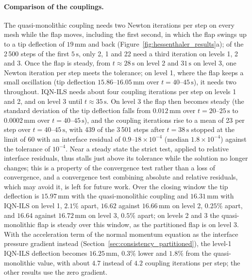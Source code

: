 \paragraph{Comparison of the couplings.}
The quasi-monolithic coupling needs two Newton iterations per step on every mesh while the flap moves, including the first second, in which the flap swings up to a tip deflection of $19\,\mathrm{mm}$ and back (Figure~\ref{fig:hessenthaler_results}a); of the 2\,500 steps of the first $5\,\mathrm{s}$, only 2, 1 and 22 need a third iteration on levels 1, 2 and 3.
Once the flap is steady, from $t \approx 28\,\mathrm{s}$ on level 2 and $31\,\mathrm{s}$ on level 3, one Newton iteration per step meets the tolerance; on level 1, where the flap keeps a small oscillation (tip deflection $15.86$--$16.05\,\mathrm{mm}$ over $t = 40$--$45\,\mathrm{s}$), it needs two throughout.
IQN-ILS needs about four coupling iterations per step on levels 1 and 2, and on level 3 until $t \approx 35\,\mathrm{s}$.
On level 3 the flap then becomes steady (the standard deviation of the tip deflection falls from $0.012\,\mathrm{mm}$ over $t = 20$--$25\,\mathrm{s}$ to $0.0002\,\mathrm{mm}$ over $t = 40$--$45\,\mathrm{s}$), and the coupling iterations rise to a mean of 23 per step over $t = 40$--$45\,\mathrm{s}$, with 439 of the 3\,501 steps after $t = 38\,\mathrm{s}$ stopped at the limit of 60 with an interface residual of $0.9$--$18\times10^{-4}$ (median $1.8\times10^{-4}$) against the tolerance of $10^{-4}$.
Near a steady state the strict test, applied to relative interface residuals, thus stalls just above its tolerance while the solution no longer changes; this is a property of the convergence test rather than a loss of convergence, and a convergence test combining absolute and relative residuals, which may avoid it, is left for future work.
Over the closing window the tip deflection is $15.97\,\mathrm{mm}$ with the quasi-monolithic coupling and $16.31\,\mathrm{mm}$ with IQN-ILS on level 1, $2.1\%$ apart, $16.62$ against $16.66\,\mathrm{mm}$ on level 2, $0.25\%$ apart, and $16.64$ against $16.72\,\mathrm{mm}$ on level 3, $0.5\%$ apart; on levels 2 and 3 the quasi-monolithic flap is steady over this window, as the partitioned flap is on level 3.
With the acceleration term of the normal momentum equation as the interface pressure gradient instead (Section~\ref{sec:consistency_partitioned}), the level-1 IQN-ILS deflection becomes $16.25\,\mathrm{mm}$, $0.3\%$ lower and $1.8\%$ from the quasi-monolithic value, with about $4.7$ instead of $4.2$ coupling iterations per step; the other results use the zero gradient.
